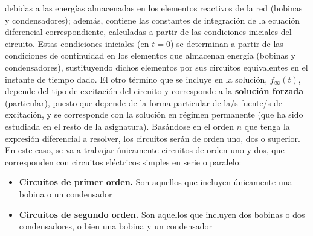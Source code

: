 debidas a las energías almacenadas en los elementos reactivos de la
red (bobinas y condensadores); además, contiene las constantes de
integración de la ecuación diferencial correspondiente, calculadas a
partir de las condiciones iniciales del circuito. Estas condiciones
iniciales (en $t=0$) se determinan a partir de las condiciones de
continuidad en los elementos que almacenan energía (bobinas y
condensadores), sustituyendo dichos elementos por sus circuitos
equivalentes en el instante de tiempo dado. El otro término que se
incluye en la solución, $f_\infty(t)$, depende del tipo de excitación
del circuito y corresponde a la \textbf{solución forzada}
(particular), puesto que depende de la forma particular de la/s
fuente/s de excitación, y se corresponde con la solución en régimen
permanente (que ha sido estudiada en el resto de la
asignatura). Basándose en el orden $n$ que tenga la expresión
diferencial a resolver, los circuitos serán de orden uno, dos o
superior. En este caso, se va a trabajar únicamente circuitos de orden
uno y dos, que corresponden con circuitos eléctricos simples en serie
o paralelo:
\begin{itemize}
\item \textbf{Circuitos de primer orden.} Son aquellos que incluyen
  únicamente una bobina o un condensador
\item \textbf{Circuitos de segundo orden.} Son aquellos que incluyen
  dos bobinas o dos condensadores, o bien una bobina y un condensador
\end{itemize}

		
